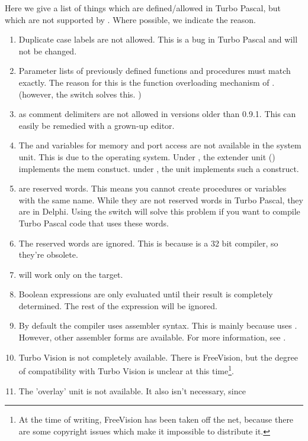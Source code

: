 \documentclass{report}
\begin{document}
Here we give a list of things which are defined/allowed in Turbo Pascal, but
which are not supported by \fpc. Where possible, we indicate the reason.
\begin{enumerate}
\item Duplicate case labels are not allowed. This is a bug in Turbo Pascal
and will not be changed.
\item Parameter lists of previously defined functions and procedures must
match exactly. The reason for this is the function overloading mechanism of
\fpc. (however, the  switch solves this. )
\item {} as comment delimiters are not allowed in versions
older than 0.9.1. This can easily be remedied with a grown-up editor.
\item The  and  variables for memory and port
access are not available in the system unit. This is due to the operating system. Under
\dos, the extender unit () implements the mem constuct.
under \linux, the  unit implements such a construct.
\item {}
are reserved words. This means you cannot create procedures or variables
with the same name. While they are not reserved words in Turbo Pascal,
they are in Delphi. Using the  switch will solve this problem if
you want to compile Turbo Pascal code that uses these words.
\item The reserved words  are ignored. This is
because \fpc is a 32 bit compiler, so they're obsolete.
\item {} will work only on the \dos target.
\item Boolean expressions are only evaluated until their result is completely
determined. The rest of the expression will be ignored.
\item By default the compiler uses   assembler syntax.
This is mainly because \fpc uses \gnu {}. However, other assembler
forms are available. For more information, see \progref.
\item Turbo Vision is not completely available. There is FreeVision, but the
degree of compatibility with Turbo Vision is unclear at this
time\footnote{At the time of writing, FreeVision has been taken off the
net, because there are some copyright issues which make it impossible to
distribute it.}.
\item The 'overlay' unit is not available. It also isn't necessary, since

\end{enumerate}
\end{document}

